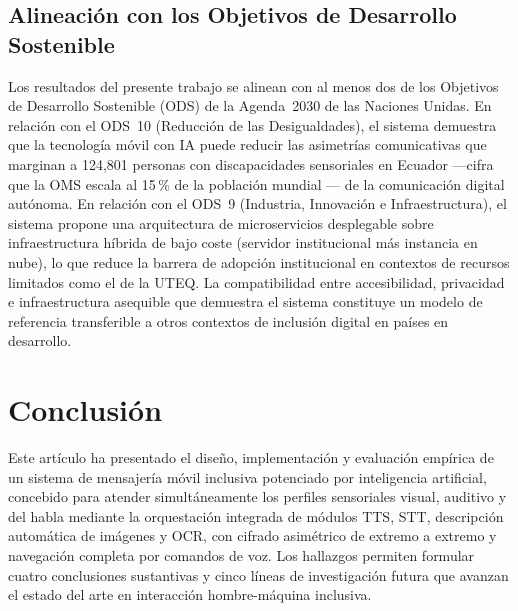\documentclass[journal]{IEEEtran}
\begin{document}
		\subsection{Alineaci\'on con los Objetivos de Desarrollo Sostenible}
			Los resultados del presente trabajo se alinean con al menos dos de los Objetivos de Desarrollo Sostenible (ODS) de la Agenda~2030 de las Naciones Unidas. En relaci\'on con el ODS~10 (Reducci\'on de las Desigualdades), el sistema demuestra que la tecnolog\'ia m\'ovil con IA puede reducir las asimetr\'ias comunicativas que marginan a 124{,}801 personas con discapacidades sensoriales en Ecuador ---cifra que la OMS escala al 15\,\% de la poblaci\'on mundial \cite{who2011}--- de la comunicaci\'on digital aut\'onoma. En relaci\'on con el ODS~9 (Industria, Innovaci\'on e Infraestructura), el sistema propone una arquitectura de microservicios desplegable sobre infraestructura h\'ibrida de bajo coste (servidor institucional m\'as instancia en nube), lo que reduce la barrera de adopci\'on institucional en contextos de recursos limitados como el de la UTEQ. La compatibilidad entre accesibilidad, privacidad e infraestructura asequible que demuestra el sistema constituye un modelo de referencia transferible a otros contextos de inclusi\'on digital en pa\'ises en desarrollo.
				
	\section{Conclusi\'on}
	\label{sec:conclusion}
		Este art\'iculo ha presentado el dise\~no, implementaci\'on y evaluaci\'on emp\'irica de un sistema de mensajer\'ia m\'ovil inclusiva potenciado por inteligencia artificial, concebido para atender simult\'aneamente los perfiles sensoriales visual, auditivo y del habla mediante la orquestaci\'on integrada de m\'odulos TTS, STT, descripci\'on autom\'atica de im\'agenes y OCR, con cifrado asim\'etrico de extremo a extremo y navegaci\'on completa por comandos de voz. Los hallazgos permiten formular cuatro conclusiones sustantivas y cinco l\'ineas de investigaci\'on futura que avanzan el estado del arte en interacci\'on hombre-m\'aquina inclusiva.
		
\end{document}
